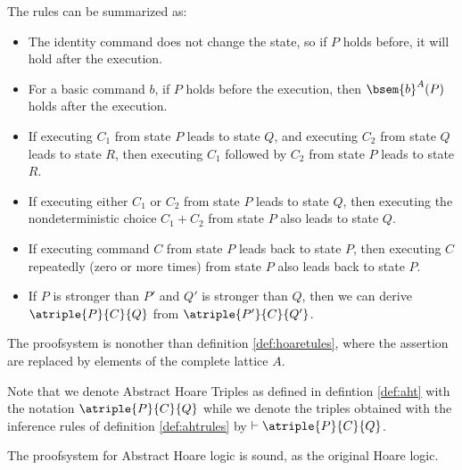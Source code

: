 The rules can be summarized as:
\begin{itemize}
  \item The identity command does not change the state, so if $P$ holds before,
    it will hold after the execution.

  \item For a basic command $b$, if $P$ holds before the execution, then 
    $\bsem{b}^A(P)$ holds after the execution.

  \item If executing $C_1$ from state $P$ leads to state $Q$, and executing
    $C_2$ from state $Q$ leads to state $R$, then executing $C_1$ followed by
    $C_2$ from state $P$ leads to state $R$.

  \item If executing either $C_1$ or $C_2$ from state $P$ leads to state $Q$,
    then executing the nondeterministic choice $C_1 + C_2$ from state $P$ also
    leads to state $Q$.

  \item If executing command $C$ from state $P$ leads back to state $P$, then
    executing $C$ repeatedly (zero or more times) from state $P$ also leads
    back to state $P$.

  \item If $P$ is stronger than $P'$ and $Q'$ is stronger than $Q$, then we can
    derive $\atriple{P}{C}{Q}$ from $\atriple{P'}{C}{Q'}$.
\end{itemize}

The proofsystem is nonother than definition \ref{def:hoaretules},
where the assertion are replaced by elements of the complete lattice $A$.

Note that we denote Abstract Hoare Triples as defined in defintion \ref{def:aht}
with the notation $\atriple{P}{C}{Q}$ while we denote the triples obtained
with the inference rules of definition \ref{def:ahtrules} by $\vdash 
\atriple{P}{C}{Q}$.

The proofsystem for Abstract Hoare logic is sound, as the original Hoare logic.

